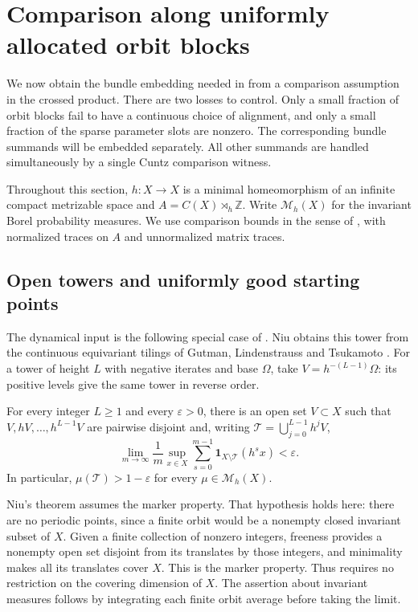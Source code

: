 \section{Comparison along uniformly allocated orbit blocks}
\label{sec:dynamical-comparison}

We now obtain the bundle embedding needed in
 from a comparison assumption in the crossed
product.  There are two losses to control.  Only a small fraction of orbit
blocks fail to have a continuous choice of alignment, and only a small
fraction of the sparse parameter slots are nonzero.  The corresponding
bundle summands will be embedded separately.  All other summands are
handled simultaneously by a single Cuntz comparison witness.

Throughout this section, $h:X\to X$ is a minimal homeomorphism of an
infinite compact metrizable space and $A=C(X)\rtimes_h\mathbb Z$.
Write $\mathcal M_h(X)$ for the invariant Borel probability measures.
We use comparison bounds in the sense of ,
with normalized traces on $A$ and unnormalized matrix traces.

\subsection{Open towers and uniformly good starting points}

The dynamical input is the following special case of
\cite[Theorem~4.2]{Niu2024}. Niu obtains this tower from the continuous
equivariant tilings of Gutman, Lindenstrauss and Tsukamoto
\cite[Lemma~4.2]{GutmanLindenstraussTsukamoto2016}.
For a tower of height $L$ with negative iterates and base $\Omega$, take
$V=h^{-(L-1)}\Omega$: its positive levels give the same tower in
reverse order.

\begin{theorem}
\label{thm:niu-open-tower}
For every integer $L\geq1$ and every $\varepsilon>0$, there is an open
set $V\subset X$ such that $V,hV,\ldots,h^{L-1}V$ are pairwise disjoint
and, writing $\mathcal T=\bigcup_{j=0}^{L-1}h^jV$,
\[
 \lim_{m\to\infty}\frac1m\sup_{x\in X}
   \sum_{s=0}^{m-1}\mathbf 1_{X\setminus\mathcal T}(h^sx)
 <\varepsilon.
\]
In particular, $\mu(\mathcal T)>1-\varepsilon$ for every
$\mu\in\mathcal M_h(X)$.
\end{theorem}

Niu's theorem assumes the marker property.  That hypothesis holds here:
there are no periodic points, since a finite orbit would be a nonempty
closed invariant subset of $X$.  Given a finite collection of nonzero
integers, freeness provides a nonempty open set disjoint from its
translates by those integers, and minimality makes all its translates
cover $X$.  This is the marker property.  Thus
 requires no restriction on the covering
dimension of $X$.  The assertion about invariant measures follows by
integrating each finite orbit average before taking the limit.

